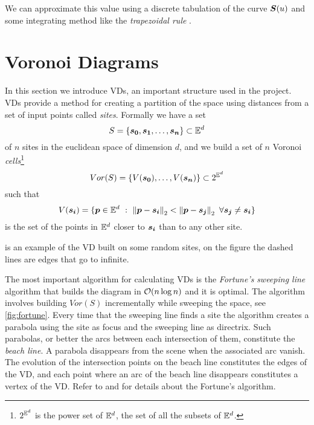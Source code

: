 \documentclass[dissertation.tex]{subfiles}
\begin{document}
We can approximate this value using a discrete tabulation of the curve
$\boldsymbol{S}(u)$ and some integrating method like the \emph{trapezoidal
  rule} \cite{press}\cite{stoer}.

\section{Voronoi Diagrams}\label{sec:voronoi}
In this section we introduce \acfp{VD}, an important structure used in
the project. \acp{VD} \cite{deberg} provide a method for creating a
partition of the
space using distances from a set of input points called
\emph{sites}. Formally we have a set
\begin{equation*}
  S=\{\boldsymbol{s_0},\boldsymbol{s_1},\dots,\boldsymbol{s_n}\} \subset \mathbb{E}^d
\end{equation*}
of $n$ sites in the euclidean space of dimension $d$, and we build a
set of $n$ Voronoi \emph{cells}\footnote{$2^{\mathbb{E}^d}$ is the power set of
  $\mathbb{E}^d$, the set of all the subsets of $\mathbb{E}^d$.}
\begin{equation*}
  Vor(S)=\{V(\boldsymbol{s_0}),\dots,V(\boldsymbol{s_n})\}\subset 2^{\mathbb{E}^d}
\end{equation*}
such that
\begin{equation*}
  V(\boldsymbol{\boldsymbol{s_i}})=\{\boldsymbol{p}\in\mathbb{E}^d\ :\
  \left\lVert\boldsymbol{p}-\boldsymbol{s_i}\right\rVert_2<\left\lVert\boldsymbol{p}-\boldsymbol{s_j}\right\rVert_2\ \forall \boldsymbol{s_j}\neq\boldsymbol{s_i}\}
\end{equation*}
is the set of the points in $\mathbb{E}^d$ closer to $\boldsymbol{s_i}$ than to any
other site.

\Cref{fig:voronoi} is an example of the \ac{VD} built on some random
sites, on the figure the dashed lines are edges that go to infinite.

The most important algorithm for
calculating \acp{VD} is the \emph{Fortune's}
\emph{sweeping line} algorithm that builds the diagram in $\mathcal{O}(n\log
n)$ and it is optimal. The algorithm involves building $Vor(S)$
incrementally while sweeping the space, see \cref{fig:fortune}. Every
time that the sweeping
line finds a site the algorithm creates a parabola using the site as
focus and the sweeping line as directrix. Such parabolas, or better
the arcs between each intersection of them, constitute
the \emph{beach line}. A parabola disappears from the scene when the
associated
arc vanish. The evolution of the intersection points on the beach line
constitutes the edges of the \ac{VD}, and each point where an arc of
the beach line disappears constitutes a vertex of the \ac{VD}.
Refer to \cite{deberg} and
\cite{fortune} for details about the Fortune's algorithm.
\end{document}
